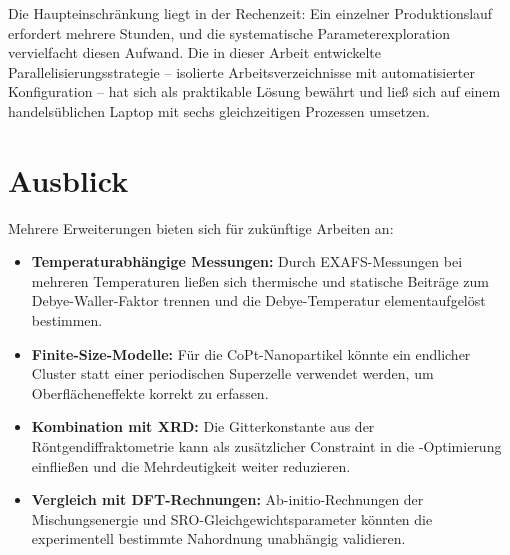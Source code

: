 Die Haupteinschränkung liegt in der Rechenzeit:
Ein einzelner Produktionslauf erfordert mehrere Stunden, und die
systematische Parameterexploration vervielfacht diesen Aufwand.
Die in dieser Arbeit entwickelte Parallelisierungsstrategie --
isolierte Arbeitsverzeichnisse mit automatisierter Konfiguration --
hat sich als praktikable Lösung bewährt und ließ sich auf einem
handelsüblichen Laptop mit sechs gleichzeitigen Prozessen umsetzen.

\section{Ausblick}

Mehrere Erweiterungen bieten sich für zukünftige Arbeiten an:

\begin{itemize}
  \item \textbf{Temperaturabhängige Messungen:}
    Durch EXAFS-Messungen bei mehreren Temperaturen ließen sich
    thermische und statische Beiträge zum Debye-Waller-Faktor
    trennen und die Debye-Temperatur elementaufgelöst bestimmen.
  \item \textbf{Finite-Size-Modelle:}
    Für die CoPt-Nanopartikel könnte ein endlicher Cluster statt
    einer periodischen Superzelle verwendet werden, um
    Oberflächeneffekte korrekt zu erfassen.
  \item \textbf{Kombination mit XRD:}
    Die Gitterkonstante aus der Röntgendiffraktometrie kann als
    zusätzlicher Constraint in die \evax{}-Optimierung einfließen
    und die Mehrdeutigkeit weiter reduzieren.
  \item \textbf{Vergleich mit DFT-Rechnungen:}
    Ab-initio-Rechnungen der Mischungsenergie und
    SRO-Gleichgewichtsparameter könnten die experimentell bestimmte
    Nahordnung unabhängig validieren.
\end{itemize}

